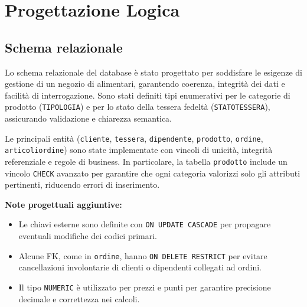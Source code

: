 \documentclass[a4paper,12pt]{article}
\begin{document}
\begin{center}
{
} %
\end{center}

\newpage
\section{Progettazione Logica}

\subsection{Schema relazionale}

Lo schema relazionale del database è stato progettato per soddisfare le esigenze di gestione di un negozio di alimentari, garantendo coerenza, integrità dei dati e facilità di interrogazione.  
Sono stati definiti tipi enumerativi per le categorie di prodotto (\texttt{TIPOLOGIA}) e per lo stato della tessera fedeltà (\texttt{STATOTESSERA}), assicurando validazione e chiarezza semantica.  

Le principali entità (\texttt{cliente}, \texttt{tessera}, \texttt{dipendente}, \texttt{prodotto}, \texttt{ordine}, \texttt{articoliordine}) sono state implementate con vincoli di unicità, integrità referenziale e regole di business.  
In particolare, la tabella \texttt{prodotto} include un vincolo \texttt{CHECK} avanzato per garantire che ogni categoria valorizzi solo gli attributi pertinenti, riducendo errori di inserimento.

\textbf{Note progettuali aggiuntive:}
\begin{itemize}
    \item Le chiavi esterne sono definite con \texttt{ON UPDATE CASCADE} per propagare eventuali modifiche dei codici primari.
    \item Alcune FK, come in \texttt{ordine}, hanno \texttt{ON DELETE RESTRICT} per evitare cancellazioni involontarie di clienti o dipendenti collegati ad ordini.
    \item Il tipo \texttt{NUMERIC} è utilizzato per prezzi e punti per garantire precisione decimale e correttezza nei calcoli.
\end{itemize}
\end{document}
